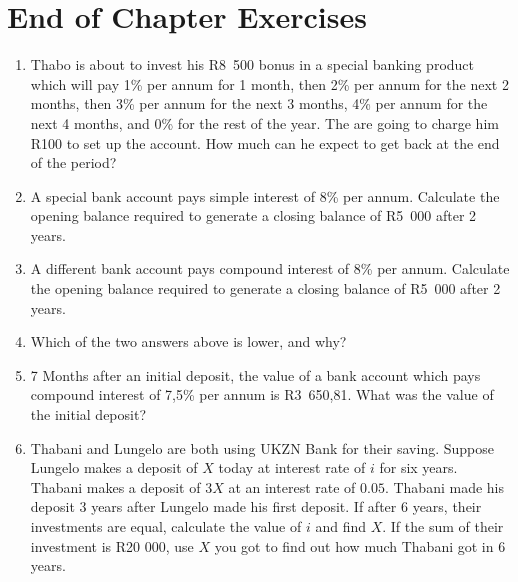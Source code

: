 \section{End of Chapter Exercises}
\begin{enumerate}
\item{Thabo is about to invest his R8~500 bonus in a special banking product which will pay 1\% per annum for 1 month, then 2\% per annum for the next 2 months, then 3\% per annum for the next 3 months, 4\% per annum for the next 4 months, and 0\% for the rest of the year. The are going to charge him R100 to set up the account. How much can he expect to get back at the end of the period?}

\item{A special bank account pays simple interest of 8\% per annum. Calculate the opening balance required to generate a closing balance of R5~000 after 2 years.}

\item{A different bank account pays compound interest of 8\% per annum. Calculate the opening balance required to generate a closing balance of R5~000 after 2 years.}

\item{Which of the two answers above is lower, and why?}

\item{7 Months after an initial deposit, the value of a bank account which pays compound interest of 7,5\% per annum is R3~650,81. What was the value of the initial deposit?}


\item{Thabani and Lungelo are both using UKZN Bank for their saving. Suppose Lungelo makes a deposit of $X$ today at interest rate of $i$ for six years. Thabani makes a deposit of $3X$ at an interest rate of $0.05$. Thabani made his deposit 3 years after Lungelo made his first deposit. If after 6 years, their investments are equal, calculate the value of $i$ and find $X$. If the sum of their investment is R20 000, use $X$ you got to find out how much Thabani got in 6 years.}


\end{enumerate}
